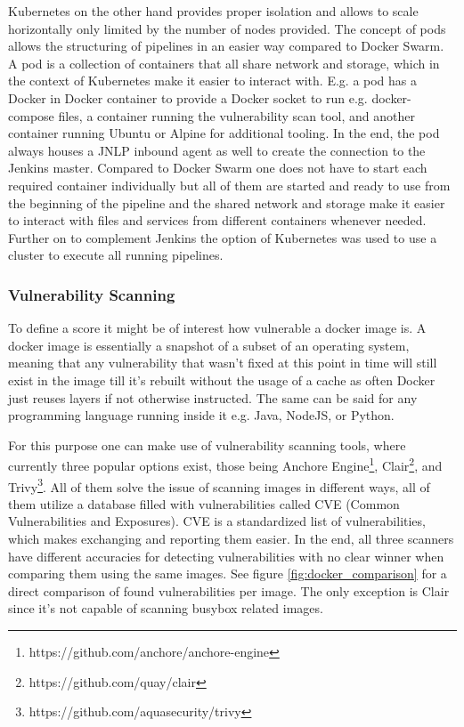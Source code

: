 Kubernetes on the other hand provides proper isolation and allows to scale horizontally only limited by the number of nodes provided. The concept of pods allows the structuring of pipelines in an easier way compared to Docker Swarm. A pod is a collection of containers that all share network and storage, which in the context of Kubernetes make it easier to interact with. E.g. a pod has a Docker in Docker container to provide a Docker socket to run e.g. docker-compose files, a container running the vulnerability scan tool, and another container running Ubuntu or Alpine for additional tooling. In the end, the pod always houses a JNLP inbound agent as well to create the connection to the Jenkins master. Compared to Docker Swarm one does not have to start each required container individually but all of them are started and ready to use from the beginning of the pipeline and the shared network and storage make it easier to interact with files and services from different containers whenever needed.
Further on to complement Jenkins the option of Kubernetes was used to use a cluster to execute all running pipelines.

\subsubsection{Vulnerability Scanning}
\label{sec:vulnerability_scanning}
To define a score it might be of interest how vulnerable a docker image is. A docker image is essentially a snapshot of a subset of an operating system, meaning that any vulnerability that wasn't fixed at this point in time will still exist in the image till it's rebuilt without the usage of a cache as often Docker just reuses layers if not otherwise instructed. The same can be said for any programming language running inside it e.g. Java, NodeJS, or Python.

For this purpose one can make use of vulnerability scanning tools, where currently three popular options exist, those being Anchore Engine\footnote{https://github.com/anchore/anchore-engine}, Clair\footnote{https://github.com/quay/clair}, and Trivy\footnote{https://github.com/aquasecurity/trivy}.
All of them solve the issue of scanning images in different ways, all of them utilize a database filled with vulnerabilities called CVE (Common Vulnerabilities and Exposures). CVE is a standardized list of vulnerabilities, which makes exchanging and reporting them easier.
In the end, all three scanners have different accuracies for detecting vulnerabilities with no clear winner when comparing them using the same images. See figure \ref{fig:docker_comparison} for a direct comparison of found vulnerabilities per image. The only exception is Clair since it's not capable of scanning busybox related images.

